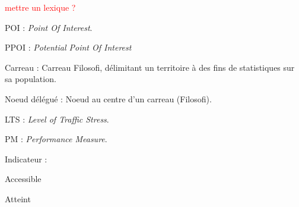 \textcolor{red}{mettre un lexique ?}

POI : \emph{Point Of Interest}.

PPOI : \emph{Potential Point Of Interest}

Carreau : Carreau Filosofi, délimitant un territoire à des fins de statistiques sur sa population.

Noeud délégué : Noeud au centre d'un carreau (Filosofi).

LTS : \emph{Level of Traffic Stress}.

PM : \emph{Performance Measure}.

Indicateur : 

Accessible

Atteint


